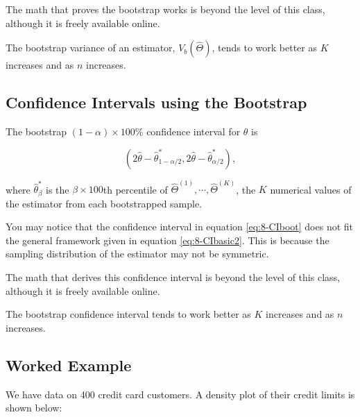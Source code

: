 \documentclass[
]{book}
\newenvironment{Shaded}{\begin{snugshade}}{\end{snugshade}}
\newcommand{\AttributeTok}[1]{\textcolor[rgb]{0.13,0.29,0.53}{#1}}
\newcommand{\FunctionTok}[1]{\textcolor[rgb]{0.13,0.29,0.53}{\textbf{#1}}}
\newcommand{\NormalTok}[1]{#1}
\newcommand{\OtherTok}[1]{\textcolor[rgb]{0.56,0.35,0.01}{#1}}
\newcommand{\SpecialCharTok}[1]{\textcolor[rgb]{0.81,0.36,0.00}{\textbf{#1}}}
\newcommand{\StringTok}[1]{\textcolor[rgb]{0.31,0.60,0.02}{#1}}
\begin{document}
The math that proves the bootstrap works is beyond the level of this class, although it is freely available online.

The bootstrap variance of an estimator, \(V_b(\hat{\Theta})\), tends to work better as \(K\) increases and as \(n\) increases.

\hypertarget{confidence-intervals-using-the-bootstrap}{%
\subsection{Confidence Intervals using the Bootstrap}\label{confidence-intervals-using-the-bootstrap}}

The bootstrap \((1-\alpha) \times 100\%\) confidence interval for \(\theta\) is

\begin{equation} 
\left( 2 \hat{\theta} - \hat{\theta}_{1-\alpha/2}^*, 2 \hat{\theta} - \hat{\theta}_{\alpha/2}^* \right), 
\label{eq:8-CIboot}
\end{equation}

where \(\hat{\theta}_{\beta}^*\) is the \(\beta \times 100\)th percentile of \(\hat{\Theta}^{(1)}, \cdots, \hat{\Theta}^{(K)}\), the \(K\) numerical values of the estimator from each bootstrapped sample.

You may notice that the confidence interval in equation \eqref{eq:8-CIboot} does not fit the general framework given in equation \eqref{eq:8-CIbasic2}. This is because the sampling distribution of the estimator may not be symmetric.

The math that derives this confidence interval is beyond the level of this class, although it is freely available online.

The bootstrap confidence interval tends to work better as \(K\) increases and as \(n\) increases.

\hypertarget{worked-example-5}{%
\subsection{Worked Example}\label{worked-example-5}}

We have data on 400 credit card customers. A density plot of their credit limits is shown below:

\begin{Shaded}
\end{Shaded}
\end{document}
